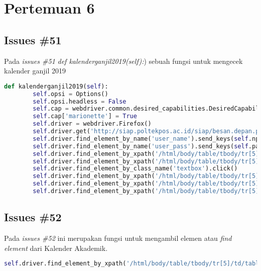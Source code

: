 \chapter{Pertemuan 6}

\section{Issues \#51}
Pada \textit{issues \#51} \textit{def kalenderganjil2019(self):}) sebuah fungsi untuk mengecek kalender ganjil 2019
\begin{lstlisting}[language=Python]
 def kalenderganjil2019(self):
        self.opsi = Options()
        self.opsi.headless = False
        self.cap = webdriver.common.desired_capabilities.DesiredCapabilities().FIREFOX
        self.cap['marionette'] = True
        self.driver = webdriver.Firefox()
        self.driver.get('http://siap.poltekpos.ac.id/siap/besan.depan.php')
        self.driver.find_element_by_name('user_name').send_keys(self.npm)
        self.driver.find_element_by_name('user_pass').send_keys(self.paswd)
        self.driver.find_element_by_xpath('/html/body/table/tbody/tr[5]/td/table[1]/tbody/tr/td[2]/table[2]/tbody/tr[1]/td[2]/div/form/input[4]').click()
        self.driver.find_element_by_xpath('/html/body/table/tbody/tr[5]/td/table[1]/tbody/tr/td[1]/table[2]/tbody/tr[1]/td[2]/a[6]').click()
        self.driver.find_element_by_class_name('textbox').click()
        self.driver.find_element_by_xpath('/html/body/table/tbody/tr[5]/td/table[3]/tbody/tr[1]/td[2]/p/table/tbody/tr[2]/td[2]/select/option[1]').click()
        self.driver.find_element_by_xpath('/html/body/table/tbody/tr[5]/td/table[3]/tbody/tr[1]/td[2]/p[1]/table/tbody/tr[4]/td[2]/select/option[2]').click()
        self.driver.find_element_by_xpath('/html/body/table/tbody/tr[5]/td/table[3]/tbody/tr[1]/td[2]/p/table/tbody/tr[5]/td/input').click()

\end{lstlisting}

\section{Issues \#52}
Pada \textit{issues \#52} ini merupakan fungsi untuk mengambil elemen atau \textit{find element} dari Kalender Akademik.
\begin{lstlisting}[language=Python]
self.driver.find_element_by_xpath('/html/body/table/tbody/tr[5]/td/table[1]/tbody/tr/td[1]/table[2]/tbody/tr[1]/td[2]/a[6]').click()
\end{lstlisting}


